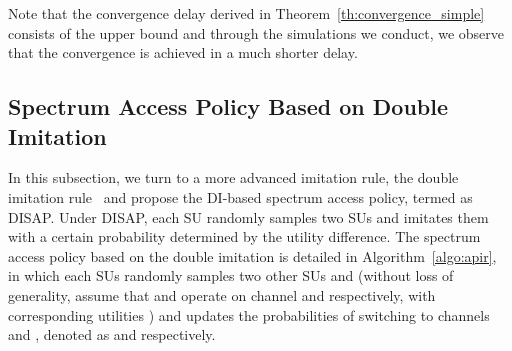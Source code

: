 \documentclass[12pt, onecolumn]{IEEEtran}
\theoremstyle{plain}
\theoremstyle{definition}
\begin{document}
Note that the convergence delay  derived in Theorem~\ref{th:convergence_simple} consists of the upper bound and through the simulations we conduct, we observe that the convergence is achieved in a much shorter delay.

\subsection{Spectrum Access Policy Based on Double Imitation}

In this subsection, we turn to a more advanced imitation rule, the double imitation rule~\cite{Schlag99} and propose the DI-based spectrum access policy, termed as DISAP. Under DISAP, each SU randomly samples two SUs and imitates them with a certain probability determined by the utility difference. The spectrum access policy based on the double imitation is detailed in Algorithm~\ref{algo:apir}, in which each SUs randomly samples two other SUs  and  (without loss of generality, assume that  and  operate on channel  and  respectively, with corresponding utilities ) and updates the probabilities of switching to channels  and , denoted as  and  respectively.

\begin{comment}

\begin{algorithm}
\caption{DISAP: executed at each SU  for each iteration}
\begin{algorithmic}[1]
\STATE \textbf{Initialization}: set the two exogenous parameters  and  such that the payoff of SUs falls into the interval , set the imitation factor  and the imitation threshold 
\STATE Randomly sample two SUs  and 
\STATE Compute , where  denotes  and  for SU 
\IF{}
\STATE 
\ELSE
\STATE 
\ENDIF
\STATE Switch to channel  with probability  if , switch to channel  with probability  if 
\end{algorithmic}
\label{algo:apir}
\end{algorithm}

\end{comment}

\begin{comment}
In our case, ,  and .
As for the simple imitation, we assume that SUs are able to exchange two parameters: utility and strategy.
\end{comment}
\end{document}
